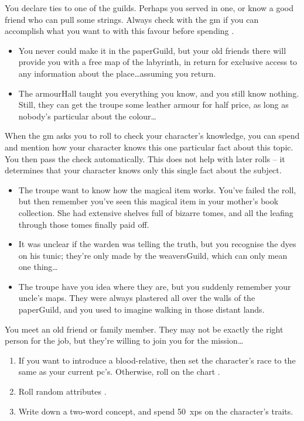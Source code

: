\begin{multicols}{2}
You declare ties to one of the guilds.
Perhaps you served in one, or know a good friend who can pull some strings.
Always check with the \gls{gm} if you can accomplish what you want to with this favour before spending .

\begin{itemize}
  \item
  You never could make it in the \gls{paperGuild}, but your old friends there will provide you with a free map of the labyrinth, in return for exclusive access to any information about the place\ldots assuming you return.
  \item
  The \gls{armourHall} taught you everything you know, and you still know nothing.
  Still, they can get the troupe some leather armour for half price, as long as nobody's particular about the colour\ldots
\end{itemize}

\label{randomFact}
When the \gls{gm} asks you to roll to check your character's knowledge, you can spend  and mention how your character knows this one particular fact about this topic.
You then pass the check automatically.
This does not help with later rolls -- it determines that your character knows only this single fact about the subject.

\begin{itemize}
  \item
  The troupe want to know how the magical item works.
  You've failed the roll, but then remember you've seen this magical item in your mother's book collection.
  She had extensive shelves full of bizarre tomes, and all the leafing through those tomes finally paid off.
  \item
  It was unclear if the \gls{warden} was telling the truth, but you recognise the dyes on his tunic; they're only made by the \gls{weaversGuild}, which can only mean one thing\ldots
  \item
  The troupe have you idea where they are, but you suddenly remember your uncle's maps.
  They were always plastered all over the walls of the \gls{paperGuild}, and you used to imagine walking in those distant lands.
\end{itemize}

\label{oldFriend}
You meet an old friend or family member.
They may not be exactly the right person for the job, but they're willing to join you for the mission\ldots

\begin{enumerate}
  \item
  If you want to introduce a blood-relative, then set the character's race to the same as your current \gls{pc}'s.
  Otherwise, roll on the chart .
  \item
  Roll random \glspl{attribute} .
  \item
  Write down a two-word concept, and spend 50~\glspl{xp} on the character's \glspl{trait}.
\end{enumerate}


\end{multicols}
